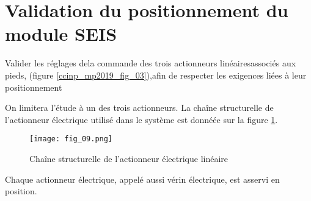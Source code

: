 \section{Validation du positionnement du module SEIS}

\begin{obj}
Valider les réglages dela commande des trois actionneurs linéairesassociés aux pieds,
 (figure \ref{ccinp_mp2019_fig_03}),afin de respecter les exigences liées à leur positionnement
\end{obj}
\ifprof
\else
On limitera l’étude à un des trois actionneurs. La chaîne structurelle de l’actionneur électrique utilisé dans le système est donnéée sur la figure \ref{fig_09}.

\begin{figure}[!h]
\centering
\texttt{[image: fig\_09.png]}
\caption{Chaîne structurelle de l’actionneur électrique linéaire \label{fig_09}}
\end{figure}

 Chaque actionneur électrique, appelé aussi vérin électrique, est asservi en position.



